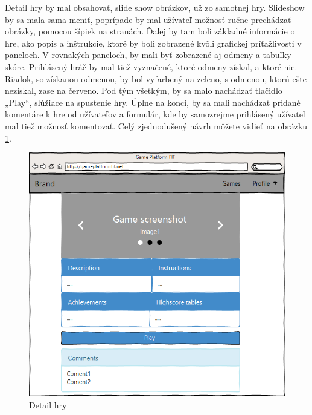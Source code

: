 Detail hry by mal obsahovať, slide show obrázkov, už zo samotnej hry. Slideshow by sa mala sama meniť, poprípade by mal užívateľ možnosť ručne prechádzať obrázky, pomocou šípiek na stranách. Ďalej by tam boli základné informácie o hre, ako popis a inštrukcie, ktoré by boli zobrazené kvôli grafickej príťažlivosti v paneloch. V rovnakých paneloch, by mali byť zobrazené aj odmeny a tabuľky skóre. Prihlásený hráč by mal tiež vyznačené, ktoré odmeny získal, a ktoré nie. Riadok, so získanou odmenou, by bol vyfarbený na zeleno, s odmenou, ktorú ešte nezískal, zase na červeno. Pod tým všetkým, by sa malo nachádzať tlačidlo „Play“, slúžiace na spustenie hry. Úplne na konci, by sa mali nachádzať pridané komentáre k hre od užívateľov a formulár, kde by samozrejme prihlásený užívateľ mal tiež možnosť komentovať. Celý zjednodušený návrh môžete vidieť na obrázku \ref{fig:guidetailrhy}.
\begin{figure}[h]
  \centering
  \includegraphics[scale=0.35]{fig/gui-detail-hry.png}
  \caption{Detail hry}
  \label{fig:guidetailrhy}
\end{figure}

